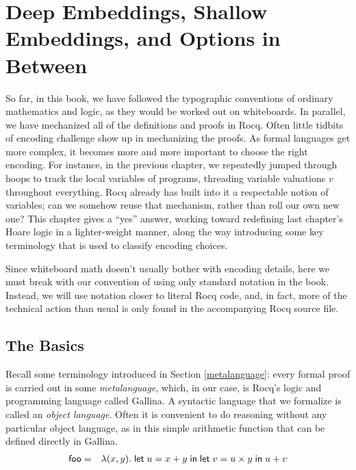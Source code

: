 \documentclass{amsbook}
\theoremstyle{definition}
\theoremstyle{remark}
\numberwithin{section}{chapter}
\numberwithin{equation}{chapter}
\begin{document}
\chapter{Deep Embeddings, Shallow Embeddings, and Options in Between}
\label{embeddings}

So far, in this book, we have followed the typographic conventions of ordinary mathematics and logic, as they would be worked out on whiteboards.
In parallel, we have mechanized all of the definitions and proofs in Rocq.
Often little tidbits of encoding challenge show up in mechanizing the proofs.
As formal languages get more complex, it becomes more and more important to choose the right encoding.
For instance, in the previous chapter, we repeatedly jumped through hoops to track the local variables of programs, threading variable valuations $v$ throughout everything.
Rocq already has built into it a respectable notion of variables; can we somehow reuse that mechanism, rather than roll our own new one?
This chapter gives a ``yes'' answer, working toward redefining last chapter's Hoare logic in a lighter-weight manner, along the way introducing some key terminology that is used to classify encoding choices.

Since whiteboard math doesn't usually bother with encoding details, here we must break with our convention of using only standard notation in the book.
Instead, we will use notation closer to literal Rocq code, and, in fact, more of the technical action than usual is only found in the accompanying Rocq source file.

\section{The Basics}\label{mixed}

Recall some terminology introduced in Section \ref{metalanguage}: every formal proof is carried out in some \emph{metalanguage}, which, in our case, is Rocq's logic and programming language called Gallina.
A syntactic language that we formalize is called an \emph{object language}.
Often it is convenient to do reasoning without any particular object language, as in this simple arithmetic function that can be defined directly in Gallina.
\begin{eqnarray*}
  \mathsf{foo} &=& \lambda(x, y). \; \mathsf{let} \; u = x + y \; \mathsf{in} \; \mathsf{let} \; v = u \times y \; \mathsf{in} \; u + v
\end{eqnarray*}
\end{document}
